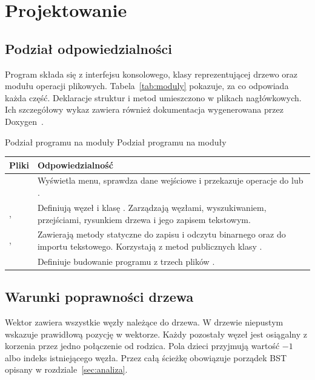 \clearpage
\section{Projektowanie}

\subsection{Podział odpowiedzialności}

Program składa się z interfejsu konsolowego, klasy reprezentującej
drzewo oraz modułu operacji plikowych. Tabela~\ref{tab:moduly}
pokazuje, za co odpowiada każda część. Deklaracje struktur i metod
umieszczono w plikach nagłówkowych. Ich szczegółowy wykaz zawiera
również dokumentacja wygenerowana przez Doxygen~\cite{doxygen-bst}.

\begin{tabela}{Podział programu na moduły}
              {Podział programu na moduły}
              {\label{tab:moduly}}
\small
\begin{tabularx}{\linewidth}{|L{4.2cm}|Y|}
\hline
\textbf{Pliki} & \textbf{Odpowiedzialność}\\ \hline
{} & Wyświetla menu, sprawdza dane wejściowe i przekazuje
                 operacje do  lub .\\ \hline
{},  & Definiują węzeł  i klasę
  . Zarządzają węzłami, wyszukiwaniem, przejściami,
  rysunkiem drzewa i jego zapisem tekstowym.\\ \hline
{},  & Zawierają metody statyczne
  do zapisu i odczytu binarnego oraz do importu tekstowego.
  Korzystają z metod publicznych klasy .\\ \hline
{} & Definiuje budowanie programu
   z trzech plików .\\ \hline
\end{tabularx}
\end{tabela}

\subsection{Warunki poprawności drzewa}

Wektor  zawiera wszystkie węzły należące do drzewa.
W drzewie niepustym  wskazuje prawidłową pozycję
w wektorze. Każdy pozostały węzeł jest osiągalny z korzenia przez
jedno połączenie od rodzica. Pola dzieci przyjmują wartość $-1$
albo indeks istniejącego węzła. Przez całą ścieżkę obowiązuje
porządek BST opisany w rozdziale~\ref{sec:analiza}.

